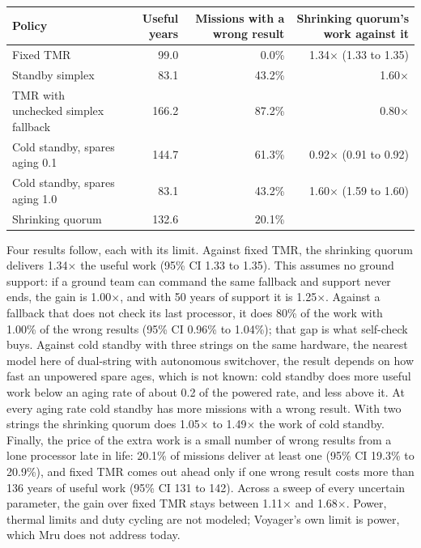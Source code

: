 \documentclass[10pt, a4paper]{article}
\begin{document}
\begin{center}
\footnotesize
\begin{tabular}{lrrr}
\hline
Policy & Useful years & Missions with a wrong result & Shrinking quorum's work against it \\
\hline
Fixed TMR & 99.0 & 0.0\% & 1.34$\times$ (1.33 to 1.35) \\
Standby simplex & 83.1 & 43.2\% & 1.60$\times$ \\
TMR with unchecked simplex fallback & 166.2 & 87.2\% & 0.80$\times$ \\
Cold standby, spares aging 0.1 & 144.7 & 61.3\% & 0.92$\times$ (0.91 to 0.92) \\
Cold standby, spares aging 1.0 & 83.1 & 43.2\% & 1.60$\times$ (1.59 to 1.60) \\
Shrinking quorum & 132.6 & 20.1\% & \\
\hline
\end{tabular}
\end{center}

Four results follow, each with its limit. Against fixed TMR, the shrinking quorum delivers 1.34$\times$ the useful work (95\% CI 1.33 to 1.35). This assumes no ground support: if a ground team can command the same fallback and support never ends, the gain is 1.00$\times$, and with 50 years of support it is 1.25$\times$. Against a fallback that does not check its last processor, it does 80\% of the work with 1.00\% of the wrong results (95\% CI 0.96\% to 1.04\%); that gap is what self-check buys. Against cold standby with three strings on the same hardware, the nearest model here of dual-string with autonomous switchover, the result depends on how fast an unpowered spare ages, which is not known: cold standby does more useful work below an aging rate of about 0.2 of the powered rate, and less above it. At every aging rate cold standby has more missions with a wrong result. With two strings the shrinking quorum does 1.05$\times$ to 1.49$\times$ the work of cold standby. Finally, the price of the extra work is a small number of wrong results from a lone processor late in life: 20.1\% of missions deliver at least one (95\% CI 19.3\% to 20.9\%), and fixed TMR comes out ahead only if one wrong result costs more than 136 years of useful work (95\% CI 131 to 142). Across a sweep of every uncertain parameter, the gain over fixed TMR stays between 1.11$\times$ and 1.68$\times$. Power, thermal limits and duty cycling are not modeled; Voyager's own limit is power, which Mru does not address today.
\end{document}
